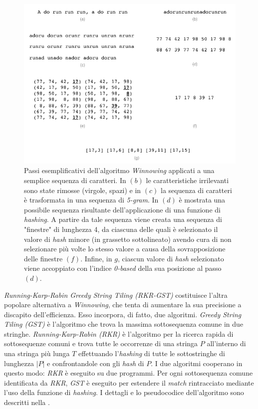 \begin{figure}[h!]
    \centering
    \includegraphics[width=\textwidth]{resources/img/01-winnowing-example.pdf}
    \caption[Passi esemplificativi dell'algoritmo \textit{Winnowing} applicati a un semplice testo scritto in linguaggio naturale.]{Passi esemplificativi dell'algoritmo \textit{Winnowing} applicati a una semplice sequenza di caratteri. In $(b)$ le caratteristiche irrilevanti sono state rimosse (virgole, spazi) e in $(c)$ la sequenza di caratteri è trasformata in una sequenza di \textit{5-gram}. In $(d)$ è mostrata una possibile sequenza risultante dell'applicazione di una funzione di \textit{hashing}. A partire da tale sequenza viene creata una sequenza di "finestre" di lunghezza 4, da ciascuna delle quali è selezionato il valore di \textit{hash} minore (in grassetto sottolineato) avendo cura di non selezionare più volte lo stesso valore a causa della sovrapposizione delle finestre $(f)$. Infine, in $g$,  ciascun valore di \textit{hash} selezionato viene accoppiato con l'indice \textit{0-based} della sua posizione al passo $(d)$.}
    \label{img:01-winnowing-example}
\end{figure}

\textit{Running-Karp-Rabin Greedy String Tiling (RKR-GST)} costituisce l'altra popolare alternativa a \textit{Winnowing}, che tenta di aumentare la sua precisione a discapito dell'efficienza. 
%
Esso incorpora, di fatto, due algoritmi.
%
\textit{Greedy String Tiling (GST)} è l'algoritmo che trova la massima sottosequenza comune in due stringhe.
%
\textit{Running-Karp-Rabin (RKR)} è l'algoritmo per la ricerca rapida di sottosequenze comuni e trova tutte le occorrenze di una stringa $P$ all'interno di una stringa più lunga $T$ effettuando l'\textit{hashing} di tutte le sottostringhe di lunghezza $|P|$ e confrontandole con gli \textit{hash} di $P$.
%
I due algoritmi cooperano in questo modo: \textit{RKR} è eseguito su due programmi.
%
Per ogni sottosequenza comune identificata da \textit{RKR}, \textit{GST} è eseguito per estendere il \textit{match} rintracciato mediante l'uso della funzione di \textit{hashing}.
%
I dettagli e lo pseudocodice dell'algoritmo sono descritti nella .

